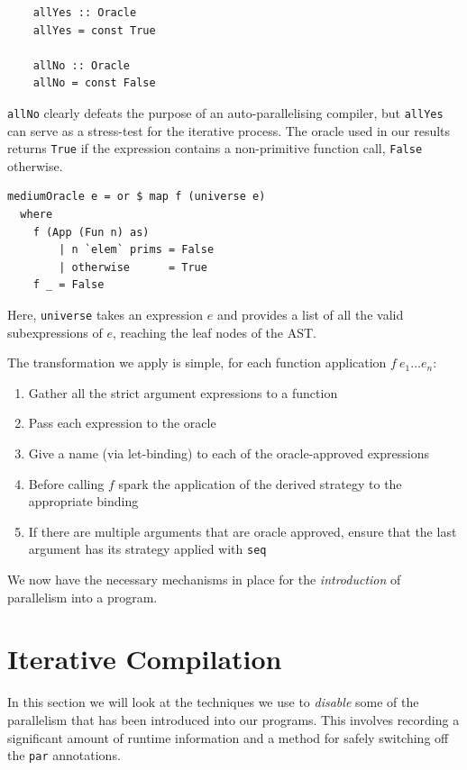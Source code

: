 \begin{verbatim}
    allYes :: Oracle
    allYes = const True

    allNo :: Oracle
    allNo = const False
\end{verbatim}

\verb-allNo- clearly defeats the purpose of an auto-parallelising compiler, but
\verb-allYes- can serve as a stress-test for the iterative process. The oracle
used in our results returns \verb-True- if the expression contains a non-primitive
function call, \verb-False- otherwise.

\begin{verbatim}
mediumOracle e = or $ map f (universe e)
  where
    f (App (Fun n) as)
        | n `elem` prims = False
        | otherwise      = True
    f _ = False
\end{verbatim}

Here, \verb-universe- takes an expression $e$ and provides a list of all the
valid subexpressions of $e$, reaching the leaf nodes of the AST.

The transformation we apply is simple, for each function application $f \ e_{1}
\dots e_{n}$:

\begin{enumerate}
    \item Gather all the strict argument expressions to a function
    \item Pass each expression to the oracle
    \item Give a name (via let-binding) to each of the oracle-approved expressions
    \item Before calling $f$ spark the application of the derived
        strategy to the appropriate binding
    \item If there are multiple arguments that are oracle approved, ensure that
        the last argument has its strategy applied with \verb-seq-
\end{enumerate}

We now have the necessary mechanisms in place for the \emph{introduction} of
parallelism into a program.
\section{Iterative Compilation}
\label{sec:iterate}

In this section we will look at the techniques we use to \emph{disable} some of
the parallelism that has been introduced into our programs. This involves
recording a significant amount of runtime information and a method for safely
switching off the \verb-par- annotations.

